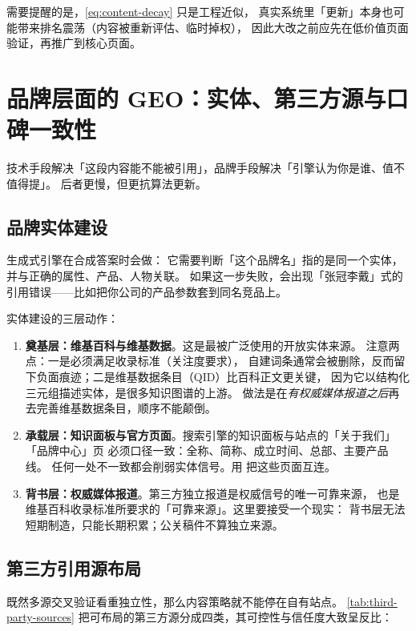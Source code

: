 需要提醒的是，\cref{eq:content-decay} 只是工程近似，
真实系统里「更新」本身也可能带来排名震荡（内容被重新评估、临时掉权），
因此大改之前应先在低价值页面验证，再推广到核心页面。

\section{品牌层面的 GEO：实体、第三方源与口碑一致性}

技术手段解决「这段内容能不能被引用」，品牌手段解决「引擎认为你是谁、值不值得提」。
后者更慢，但更抗算法更新。

\subsection{品牌实体建设}

生成式引擎在合成答案时会做：
它需要判断「这个品牌名」指的是同一个实体，并与正确的属性、产品、人物关联。
如果这一步失败，会出现「张冠李戴」式的引用错误——比如把你公司的产品参数套到同名竞品上。

实体建设的三层动作：

\begin{enumerate}
  \item \textbf{奠基层：维基百科与维基数据}。这是最被广泛使用的开放实体来源。
        注意两点：一是必须满足收录标准（关注度要求），
        自建词条通常会被删除，反而留下负面痕迹；二是维基数据条目（QID）比百科正文更关键，
        因为它以结构化三元组描述实体，是很多知识图谱的上游。
        做法是在\emph{有权威媒体报道之后}再去完善维基数据条目，顺序不能颠倒。
  \item \textbf{承载层：知识面板与官方页面}。搜索引擎的知识面板与站点的「关于我们」「品牌中心」页
        必须口径一致：全称、简称、成立时间、总部、主要产品线。
        任何一处不一致都会削弱实体信号。用  把这些页面互连。
  \item \textbf{背书层：权威媒体报道}。第三方独立报道是权威信号的唯一可靠来源，
        也是维基百科收录标准所要求的「可靠来源」。这里要接受一个现实：
        背书层无法短期制造，只能长期积累；公关稿件不算独立来源。
\end{enumerate}

\subsection{第三方引用源布局}

既然多源交叉验证看重独立性，那么内容策略就不能停在自有站点。
\cref{tab:third-party-sources} 把可布局的第三方源分成四类，其可控性与信任度大致呈反比：


